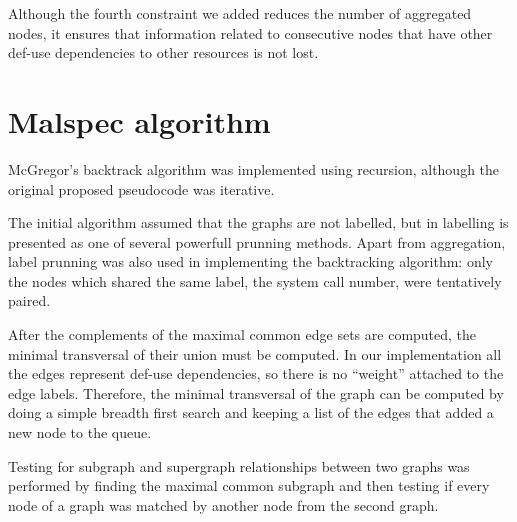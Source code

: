 Although the fourth constraint we added reduces the number of aggregated nodes, it ensures that information related to consecutive nodes that have other def-use dependencies to other resources is not lost.

\section{Malspec algorithm}
\label{fourth:malspec-alg}

McGregor's backtrack algorithm was implemented using recursion, although the original proposed pseudocode was iterative.

The initial algorithm assumed that the graphs are not labelled, but in \cite{minimal-contrast-subgraph} labelling is presented as one of several powerfull prunning methods. Apart from aggregation, label prunning was also used in implementing the backtracking algorithm: only the nodes which shared the same label, the system call number, were tentatively paired.

After the complements of the maximal common edge sets are computed, the minimal transversal of their union must be computed. In our implementation all the edges represent def-use dependencies, so there is no ``weight'' attached to the edge labels. Therefore, the minimal transversal of the graph can be computed by doing a simple breadth first search and keeping a list of the edges that added a new node to the queue.

Testing for subgraph and supergraph relationships between two graphs was performed by finding the maximal common subgraph and then testing if every node of a graph was matched by another node from the second graph.
